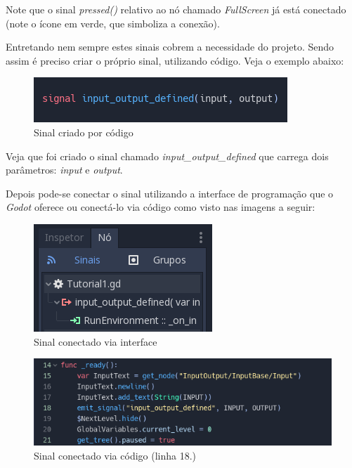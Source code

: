 Note que o sinal \textit{pressed()} relativo ao nó chamado \textit{FullScreen} 
já está conectado (note o ícone em verde, que simboliza a conexão).

Entretando nem sempre estes sinais cobrem a necessidade do projeto. Sendo assim
é preciso criar o próprio sinal, utilizando código. Veja o exemplo abaixo:

\begin{figure}[H]
    \includegraphics[scale=0.6]{../figuras/criando_sinal_via_codigo.png}
    \caption{Sinal criado por código}
\end{figure}

Veja que foi criado o sinal chamado \textit{input\_output\_defined} que
carrega dois parâmetros: \textit{input} e \textit{output}. 

Depois pode-se conectar o sinal utilizando a interface de programação
que o \textit{Godot} oferece ou conectá-lo via código como visto nas imagens
a seguir:

\begin{figure}[H]
    \includegraphics[scale=0.8]{../figuras/sinal_conectado_interface.png}
    \caption{Sinal conectado via interface}
\end{figure}

\begin{figure}[H]
      \includegraphics[width=\textwidth]{../figuras/sinal_conectado_codigo.png}
      \caption{Sinal conectado via código (linha 18.)}
\end{figure}




